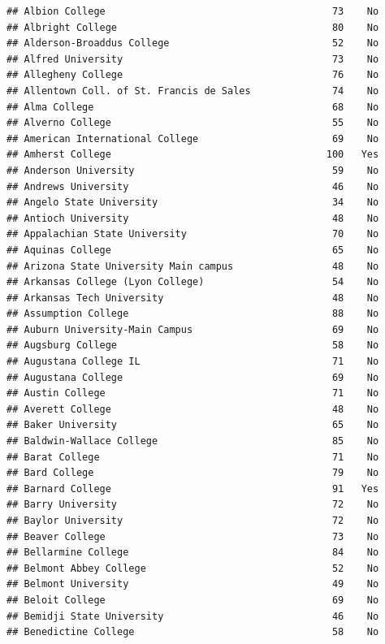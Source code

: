 \documentclass[
]{article}
\begin{document}
\begin{verbatim}
## Albion College                                       73    No
## Albright College                                     80    No
## Alderson-Broaddus College                            52    No
## Alfred University                                    73    No
## Allegheny College                                    76    No
## Allentown Coll. of St. Francis de Sales              74    No
## Alma College                                         68    No
## Alverno College                                      55    No
## American International College                       69    No
## Amherst College                                     100   Yes
## Anderson University                                  59    No
## Andrews University                                   46    No
## Angelo State University                              34    No
## Antioch University                                   48    No
## Appalachian State University                         70    No
## Aquinas College                                      65    No
## Arizona State University Main campus                 48    No
## Arkansas College (Lyon College)                      54    No
## Arkansas Tech University                             48    No
## Assumption College                                   88    No
## Auburn University-Main Campus                        69    No
## Augsburg College                                     58    No
## Augustana College IL                                 71    No
## Augustana College                                    69    No
## Austin College                                       71    No
## Averett College                                      48    No
## Baker University                                     65    No
## Baldwin-Wallace College                              85    No
## Barat College                                        71    No
## Bard College                                         79    No
## Barnard College                                      91   Yes
## Barry University                                     72    No
## Baylor University                                    72    No
## Beaver College                                       73    No
## Bellarmine College                                   84    No
## Belmont Abbey College                                52    No
## Belmont University                                   49    No
## Beloit College                                       69    No
## Bemidji State University                             46    No
## Benedictine College                                  58    No

\end{verbatim}
\end{document}

